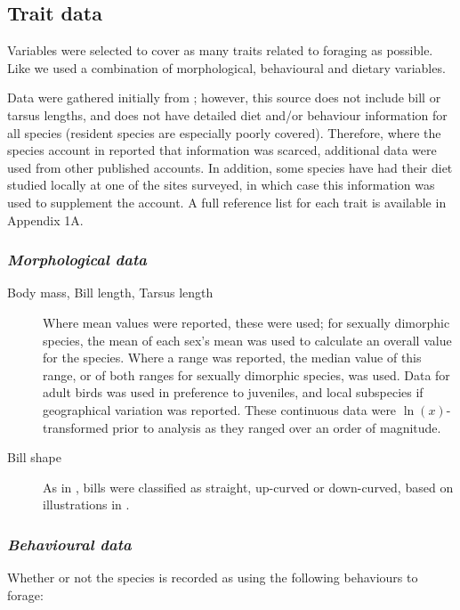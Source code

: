 \documentclass[12pt,a4paper,draft]{book}
\begin{document}
\subsection{Trait data}	

Variables were selected to cover as many traits related to foraging as possible. Like \cite{Mendez2012} we used a combination of morphological, behavioural and dietary variables.

Data were gathered initially from \cite{DelHoyo2016}; however, this source does not include bill or tarsus lengths, and does not have detailed diet and/or behaviour information for all species (resident species are especially poorly covered). Therefore, where the species account in \cite{DelHoyo2016} reported that information was scarced, additional data were used from other published accounts. In addition, some species have had their diet studied locally at one of the sites surveyed, in which case this information was used to supplement the \cite{DelHoyo2016} account. A full reference list for each trait is available in Appendix 1A.


\subsubsection{\textit{Morphological data}}

\begin{description}
\item[Body mass, Bill length, Tarsus length] Where mean values were reported, these were used; for sexually dimorphic species, the mean of each sex's mean was used to calculate an overall value for the species. Where a range was reported, the median value of this range, or of both ranges for sexually dimorphic species, was used. Data for adult birds was used in preference to juveniles, and local subspecies if geographical variation was reported. These continuous data were $\ln(x)$-transformed prior to analysis as they ranged over an order of magnitude.
\item[Bill shape] As in \cite{Mendez2012}, bills were classified as straight, up-curved or down-curved, based on illustrations in \cite{DelHoyo2016}.
\end{description}
\medskip
\subsubsection{\textit{Behavioural data}} Whether or not the species is recorded as using the following behaviours to forage:
\end{document}
